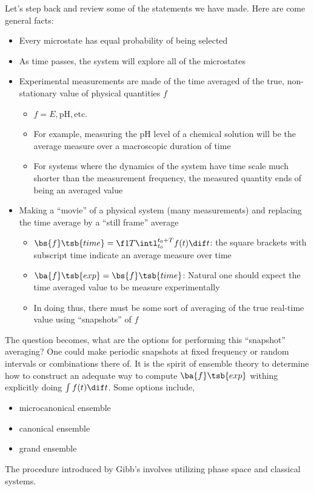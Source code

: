 \documentclass{article}
\begin{document}
Let's step back and review some of the statements we have made. Here are come general facts:
\begin{itemize}
    \item Every microstate has equal probability of being selected
    \item As time passes, the system will explore all of the microstates
    \item Experimental measurements are made of the time averaged of the true, non-stationary value of physical quantities $f$
    \begin{itemize}
        \item $f = E, \text{pH}, \text{etc.}$
        \item For example, measuring the pH level of a chemical solution will be the average measure over a macroscopic duration of time
        \item For systems where the dynamics of the system have time scale much shorter than the measurement frequency, the measured quantity ends of being an averaged value
    \end{itemize}
    \item Making a ``movie'' of a physical system (many measurements) and replacing the time average by a ``still frame'' average
    \begin{itemize}
        \item $\bs{f}\tsb{time} = \f1T \intl_{t_0}^{t_0 + T} f(t) \dif t$: the square brackets with subscript time indicate an average measure over time
        \item $\ba{f}\tsb{exp} = \bs{f}\tsb{time}$: Natural one should expect the time averaged value to be measure experimentally
        \item In doing thus, there must be some sort of averaging of the true real-time value using ``snapshots'' of $f$
    \end{itemize}
\end{itemize}
The question becomes, what are the options for performing this ``snapshot'' averaging? One could make periodic snapshots at fixed frequency or random intervals or combinations there of. It is the spirit of ensemble theory to determine how to construct an adequate way to compute $\ba{f}\tsb{exp}$ withing explicitly doing $\int f(t) \dif t$. Some options include,
\begin{itemize}
    \item microcanonical ensemble
    \item canonical ensemble
    \item grand ensemble
\end{itemize}
The procedure introduced by Gibb's involves utilizing phase space and classical systems.\\
\end{document}
